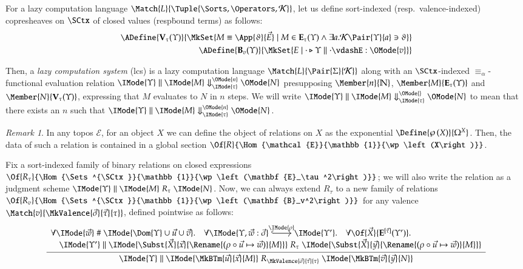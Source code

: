 \documentclass[11pt]{article}
\theoremstyle{definition}
\theoremstyle{notation}
\theoremstyle{remark}
\newtheorem{remark}[thm]{Remark}
\numberwithin{equation}{section}
\newcommand\Pow[1]{\wp\left(#1\right)}
\newcommand\CanOperators{\mathcal{K}}
\newcommand\IsAbtUnmoded[5]{
  #1\triangleright%
  #2\parallel%
  #3\vdash%
  #4:\OMode{#5}%
}
\newcommand\EvalN[5]{\IMode{#1}\parallel\IMode{#4}\Downarrow^{\OMode{#3}}_{\IMode{#2}}\OMode{#5}}
\newcommand\Eval[4]{\EvalN{#1}{#2}{}{#3}{#4}}
\newcommand\Exprs{\mathbf{E}}
\newcommand\Values{\mathbf{V}}
\newcommand\BTms{\mathbf{B}}
\newcommand\Naturals{\mathbb{N}}
\begin{document}
For a lazy computation language
$\Match{L}{\Tuple{\Sorts,\Operators,\CanOperators}}$, let us define
sort-indexed (resp.\ valence-indexed) copresheaves on $\SCtx$ of closed values
(resp\. bound terms) as follows:
\begin{align*}
  \ADefine{\Values_\tau(\Upsilon)}{
    \MkSet{
      M\equiv\App{\vartheta}{\vec{E}}
      \mid M\in\Exprs_\tau(\Upsilon)\land \exists a. \CanOperators\Pair{\Upsilon}{a}\ni\vartheta
    }
  }\\
  \ADefine{
    \BTms_{v}(\Upsilon)
  }{
    \MkSet{E \mid \IsAbtUnmoded{\cdot}{\Upsilon}{\cdot}{E}{v}}
  }
\end{align*}

Then, a \emph{lazy computation system} (lcs) is a lazy computation language
$\Match{L}{\Pair{\Sigma}{\CanOperators}}$ along with an $\SCtx$-indexed
$\equiv_\alpha$-functional evaluation relation
$\EvalN{\Upsilon}{\tau}{n}{M}{N}$ presupposing $\Member{n}{\Naturals}$,
$\Member{M}{\Exprs_\tau(\Upsilon)}$ and $\Member{N}{\Values_\tau(\Upsilon)}$,
expressing that $M$ evaluates to $N$ in $n$ steps.  We will write
$\Eval{\Upsilon}{\tau}{M}{N}$ to mean that there exists an $n$ such that
$\EvalN{\Upsilon}{\tau}{n}{M}{N}$.

\begin{remark}
  In any topos $\mathcal{E}$, for an object $X$ we can define the object of
  relations on $X$ as the exponential $\Define{\Pow{X}}{\Omega^X}$. Then, the
  data of such a relation is contained in a global section
  $\Of{R}{\Hom{\mathcal{E}}{\mathbb{1}}{\Pow{X}}}$.
\end{remark}

\newcommand\SBinRel[4]{\IMode{#2}\parallel\IMode{#3}\mathrel{#1}\IMode{#4}}

Fix a sort-indexed family of binary relations on closed expressions
$\Of{R_\tau}{\Hom{\Sets^{\SCtx}}{\mathbb{1}}{\Pow{\Exprs_\tau^2}}}$; we will
also write the relation as a judgment scheme
$\SBinRel{R_\tau}{\Upsilon}{M}{N}$. Now, we can always extend $R_\tau$ to a new
family of relations
$\Of{R_v}{\Hom{\Sets^{\SCtx}}{\mathbb{1}}{\Pow{\BTms_v^2}}}$ for any valence
$\Match{v}{\MkValence{\vec{\sigma}}{\vec{\tau}}{\tau}}$, defined pointwise as
follows:
\[
  \infer{
    \SBinRel{R_{\MkValence{\vec{\sigma}}{\vec{\tau}}{\tau}}}{\Upsilon}{
      \MkBTm{\vec{u}}{\vec{x}}{M}
    }{
      \MkBTm{\vec{v}}{\vec{y}}{N}
    }
  }{
    \begin{array}{l}
      \forall\IMode{\vec{w}}\mathrel{\#}\IMode{\Dom{\Upsilon}\cup\vec{u}\cup\vec{v}}.\quad
      \forall
        \begin{tikzcd}[cramped, ampersand replacement = \&]
           \IMode{\Upsilon,\vec{w}:\vec{\sigma}} \arrow[r,hook,"\IMode{\rho}"] \&\IMode{\Upsilon'}
        \end{tikzcd}.\quad
      \forall\Of{\vec{X}}{\Exprs^{[\vec{\tau}]}(\Upsilon')}.\\
      \quad
      \SBinRel{R_\tau}{\Upsilon'}{
        \Subst{\vec{X}}{\vec{x}}{
          \Rename{(\rho\circ \vec{u}\mapsto\vec{w})}{M}
        }
      }{
        \Subst{\vec{X}}{\vec{y}}{
          \Rename{(\rho\circ \vec{u}\mapsto\vec{w})}{M}
        }
      }
    \end{array}
  }
\]
\end{document}
